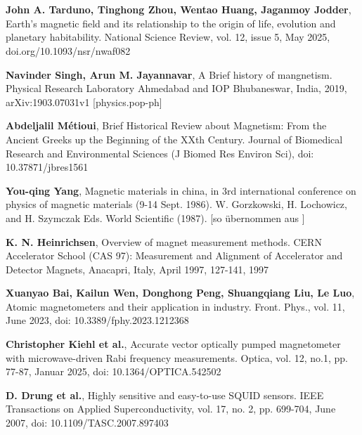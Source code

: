 \documentclass[12pt, a4paper]{article}
\begin{document}
\section*{%
}	%
\newpage
\begin{thebibliography}{}
	
	\textbf{John A. Tarduno, Tinghong Zhou, Wentao Huang, Jaganmoy Jodder}, Earth’s magnetic field and its relationship to the origin of
	life, evolution and planetary habitability. National Science Review, vol. 12, issue 5, May 2025, doi.org/10.1093/nsr/nwaf082 
	
	\textbf{Navinder Singh, Arun M. Jayannavar}, A Brief history of mangnetism. Physical Research Laboratory Ahmedabad and IOP Bhubaneswar, India, 2019, arXiv:1903.07031v1 [physics.pop-ph]
	
	\textbf{Abdeljalil Métioui}, Brief Historical Review about
	Magnetism: From the Ancient Greeks up the Beginning of the XXth Century. Journal of Biomedical Research and Environmental Sciences (J Biomed Res Environ Sci), doi: 10.37871/jbres1561
	
	\textbf{You-qing Yang}, Magnetic materials in china, in 3rd international conference on physics of magnetic materials (9-14 Sept. 1986). W. Gorzkowski, H. Lochowicz, and H. Szymczak Eds. World Scientific (1987). [so übernommen aus \cite{singh19}]
	
	
	
	
	
	\textbf{K. N. Heinrichsen}, Overview of magnet measurement methods. CERN Accelerator School (CAS 97): Measurement and Alignment of Accelerator and Detector Magnets, Anacapri, Italy, April 1997, 127-141, 1997
	
	\textbf{Xuanyao Bai, Kailun Wen, Donghong Peng, Shuangqiang Liu, Le Luo}, Atomic magnetometers and their application in industry. Front. Phys., vol. 11, June 2023, doi: 10.3389/fphy.2023.1212368
	
	\textbf{Christopher Kiehl et al.}, Accurate vector optically pumped magnetometer with microwave-driven Rabi frequency measurements. Optica, vol. 12, no.1, pp. 77-87, Januar 2025, doi: 10.1364/OPTICA.542502
	
	\textbf{D. Drung et al.}, Highly sensitive and easy-to-use SQUID sensors. IEEE Transactions on Applied Superconductivity, vol. 17, no. 2, pp. 699-704, June 2007, doi: 10.1109/TASC.2007.897403
	

\end{thebibliography}
\end{document}
